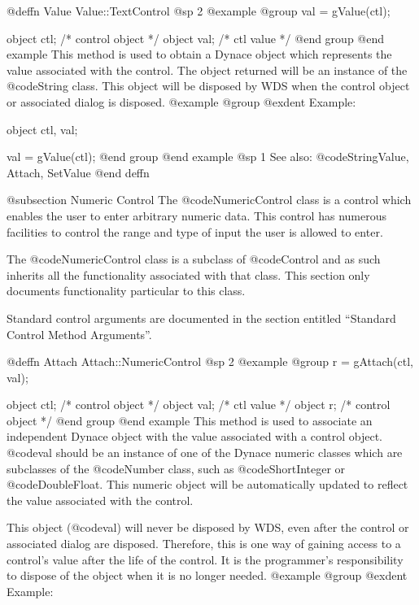 @deffn {Value} Value::TextControl
@sp 2
@example
@group
val = gValue(ctl);

object  ctl;   /*  control object  */
object  val;   /*  ctl value       */
@end group
@end example
This method is used to obtain a Dynace object which represents the value
associated with the control.  The object returned will be an instance of
the @code{String} class.  This object will be disposed by WDS when the
control object or associated dialog is disposed.
@example
@group
@exdent Example:

object  ctl, val;

val = gValue(ctl);
@end group
@end example
@sp 1
See also:  @code{StringValue, Attach, SetValue}
@end deffn








@subsection Numeric Control
The @code{NumericControl} class is a control which enables the user to
enter arbitrary numeric data.  This control has numerous facilities to
control the range and type of input the user is allowed to enter.

The @code{NumericControl} class is a subclass of @code{Control} and as such
inherits all the functionality associated with that class.  This section
only documents functionality particular to this class.

Standard control arguments are documented in the section entitled
``Standard Control Method Arguments''.












@deffn {Attach} Attach::NumericControl
@sp 2
@example
@group
r = gAttach(ctl, val);

object  ctl;   /*  control object  */
object  val;   /*  ctl value       */
object  r;     /*  control object  */
@end group
@end example
This method is used to associate an independent Dynace object with the
value associated with a control object.  @code{val} should be an
instance of one of the Dynace numeric classes which are subclasses of
the @code{Number} class, such as @code{ShortInteger} or
@code{DoubleFloat}.  This numeric object will be automatically updated
to reflect the value associated with the control.

This object (@code{val}) will never be disposed by WDS, even after
the control or associated dialog are disposed.  Therefore, this
is one way of gaining access to a control's value after the life
of the control.  It is the programmer's responsibility to dispose of
the object when it is no longer needed.
@example
@group
@exdent Example:

